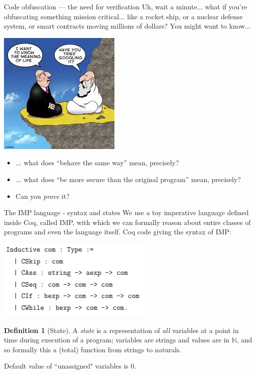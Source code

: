 \documentclass[10pt,handout]{beamer}
\theoremstyle{plain}
\theoremstyle{definition}
\newtheorem{defin}[theo]{Definition}
\newcommand\N{\mathbb{N}}
\begin{document}
    
\begin{frame}{Code obfuscation --- the need for verification}
\medskip Uh, wait a minute... what if you're obfuscating something mission critical... like a rocket ship, or a nuclear defense system, or smart contracts moving millions of dollars?  You might want to know...
\par \begin{center}\includegraphics[scale=0.3]{meaning}\end{center}
\begin{itemize}\pause
	\item
    	... what does ``behave the same way'' mean, precisely?\pause
    \item
    	... what does ``be more secure than the original program'' mean, precisely?\pause
    \item
    	Can you \emph{prove} it?
\end{itemize}

\end{frame}

\begin{frame}{The IMP language - syntax and states}
We use a toy imperative language defined inside Coq, called IMP, with which we can formally reason about entire classes of programs and even the language itself.  Coq code giving the syntax of IMP:

\includegraphics[scale=0.6]{ImpSyntax}
\pause
\begin{defin}[State]
A \emph{state} is a representation of \emph{all} variables at a point in time during execution of a program; variables are strings and values are in $\N$, and so formally this a (total) function from strings to naturals.  

\par Default value of ``unassigned" variables is 0.
\end{defin}
\end{frame}
\end{document}
